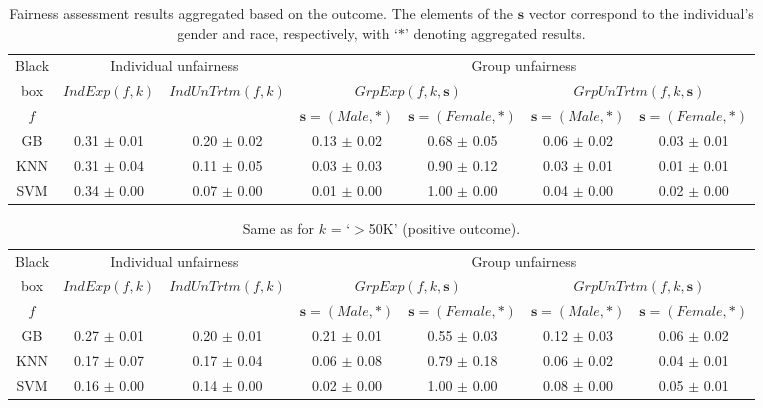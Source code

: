 \documentclass[letterpaper]{article} %
\begin{document}
\begin{table*}[t!]
	\begin{center}{\caption{Fairness assessment results aggregated based on the outcome. The elements of the $\boldsymbol{s}$ vector correspond to the individual's gender and race, respectively, with `$*$' denoting aggregated results.}\label{tab:res}}
		\begin{tabular}{c|c|c|c|c|c|c}
			\toprule
			Black & \multicolumn{2}{c|}{Individual unfairness} & \multicolumn{4}{c}{Group unfairness} \\
			box & $IndExp(f,k)$ & $IndUnTrtm(f,k)$ & \multicolumn{2}{c|}{$GrpExp(f, k, \boldsymbol{s})$} & \multicolumn{2}{c}{$GrpUnTrtm(f, k, \boldsymbol{s})$} \\
			$f$ & & & $\boldsymbol{s} = (Male, *)$ & $\boldsymbol{s} = (Female, *)$ & $\boldsymbol{s} = (Male, *)$ & $\boldsymbol{s} = (Female, *)$ \\
			\midrule						
			GB & 0.31 $\pm$ 0.01 & 0.20 $\pm$ 0.02 & 0.13 $\pm$ 0.02 & 0.68 $\pm$ 0.05 & 0.06 $\pm$ 0.02 & 0.03 $\pm$ 0.01 \\
			KNN & 0.31 $\pm$ 0.04 & 0.11 $\pm$ 0.05 & 0.03 $\pm$ 0.03 & 0.90 $\pm$ 0.12 & 0.03 $\pm$ 0.01 & 0.01 $\pm$ 0.01 \\
			SVM & 0.34 $\pm$ 0.00 & 0.07 $\pm$ 0.00 & 0.01 $\pm$ 0.00 & 1.00 $\pm$ 0.00 & 0.04 $\pm$ 0.00 & 0.02 $\pm$ 0.00 \\
			\bottomrule
		\end{tabular}
	\end{center}
\end{table*}

\begin{table*}[t!]
	\begin{center}{\caption{Same as  for $k$ = `$>$50K' (positive outcome).}\label{tab:res1}}
		\begin{tabular}{c|c|c|c|c|c|c}
			\toprule
			Black & \multicolumn{2}{c|}{Individual unfairness} & \multicolumn{4}{c}{Group unfairness} \\
			box & $IndExp(f,k)$ & $IndUnTrtm(f,k)$ & \multicolumn{2}{c|}{$GrpExp(f, k, \boldsymbol{s})$} & \multicolumn{2}{c}{$GrpUnTrtm(f, k, \boldsymbol{s})$} \\
			$f$ & & & $\boldsymbol{s} = (Male, *)$ & $\boldsymbol{s} = (Female, *)$ & $\boldsymbol{s} = (Male, *)$ & $\boldsymbol{s} = (Female, *)$ \\
			\midrule					
			GB & 0.27 $\pm$ 0.01 & 0.20 $\pm$ 0.01 & 0.21 $\pm$ 0.01 & 0.55 $\pm$ 0.03 & 0.12 $\pm$ 0.03 & 0.06 $\pm$ 0.02 \\
			KNN & 0.17 $\pm$ 0.07 & 0.17 $\pm$ 0.04 & 0.06 $\pm$ 0.08 & 0.79 $\pm$ 0.18 & 0.06 $\pm$ 0.02 & 0.04 $\pm$ 0.01 \\
			SVM & 0.16 $\pm$ 0.00 & 0.14 $\pm$ 0.00 & 0.02 $\pm$ 0.00 & 1.00 $\pm$ 0.00 & 0.08 $\pm$ 0.00 & 0.05 $\pm$ 0.01 \\
			\bottomrule
		\end{tabular}
	\end{center}
\end{table*}
\end{document}
